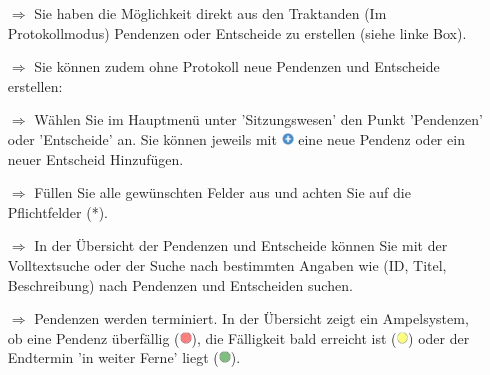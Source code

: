 \documentclass{article}
\begin{document}
\begin{multicols}{2}
\begin{tcolorbox}[colback=blue!5,colframe=blue!40!black,title=Pendenz- und Entscheid-Listen]
\begin{itemize}
  \item[$\Longrightarrow$] Sie haben die Möglichkeit direkt aus den Traktanden (Im Protokollmodus) Pendenzen oder Entscheide zu erstellen (siehe linke Box).
  \item[$\Longrightarrow$] Sie können zudem ohne Protokoll neue Pendenzen und Entscheide erstellen: 
  \item[$\Longrightarrow$] Wählen Sie im Hauptmenü unter 'Sitzungswesen' den Punkt 'Pendenzen' oder 'Entscheide' an. Sie können jeweils mit \includegraphics[height=9pt]{Icons/Plussymbol.png} eine neue Pendenz oder ein neuer Entscheid Hinzufügen.
  \item[$\Longrightarrow$] Füllen Sie alle gewünschten Felder aus und achten Sie auf die Pflichtfelder (*). 
	\item[$\Longrightarrow$] In der Übersicht der Pendenzen und Entscheide können Sie mit der Volltextsuche oder der Suche nach bestimmten Angaben wie (ID, Titel, Beschreibung) nach Pendenzen und Entscheiden suchen.
	\item[$\Longrightarrow$] Pendenzen werden terminiert. In der Übersicht zeigt ein Ampelsystem, ob eine Pendenz überfällig (\includegraphics[height=9pt]{Icons/PunktRot.png}), die Fälligkeit bald erreicht ist (\includegraphics[height=9pt]{Icons/PunktGelb.png}) oder der Endtermin  'in weiter Ferne' liegt (\includegraphics[height=9pt]{Icons/PunktGruen.png}).
\end{itemize}
\end{tcolorbox}


\end{multicols}


\end{document}
